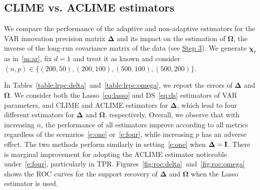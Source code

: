 \subsection{CLIME vs. ACLIME estimators}
\label{sec:sim:adaptive}

We compare the performance of the adaptive and non-adaptive estimators for the VAR innovation precision matrix $\bm\Delta$ and its impact on the estimation of $\bm\Omega$, the inverse of the long-run covariance matrix of the data (see \hyperref[sec:step:three]{Step 3}).
We generate $\bm\chi_t$ as in~\ref{m:ar}, fix $d = 1$ and treat it as known and consider $(n, p) \in \{(200, 50), (200, 100), (500, 100), (500, 200)\}$.

In Tables~\ref{table:lrpc:delta}~and~\ref{table:lrpc:omega}, we report the errors of $\bm\Delta$ and $\bm\Omega$.
We consider both the Lasso~\eqref{eq:lasso} and DS~\eqref{eq:ds} estimators of VAR parameters, and CLIME and ACLIME estimators for $\bm\Delta$, which lead to four different estimators for $\bm\Delta$ and $\bm\Omega$, respectively.
Overall, we observe that with increasing $n$, the performance of all estimators improve according to all metrics regardless of the scenarios~\ref{e:one} or~\ref{e:four}, while increasing $p$ has an adverse effect.
The two methods perform similarly in setting~\ref{e:one} when $\bm\Delta = \mathbf I$.
There is marginal improvement for adopting the ACLIME estimator noticeable under~\ref{e:four}, particularly in TPR.
Figures~\ref{fig:roc:delta}~and~\ref{fig:roc:omega} shows the ROC curves for the support recovery of $\bm\Delta$ and $\bm\Omega$ when the Lasso estimator is used. 

